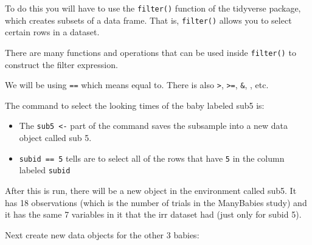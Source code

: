 \documentclass[
]{book}
\newenvironment{Shaded}{\begin{snugshade}}{\end{snugshade}}
\newcommand{\DecValTok}[1]{\textcolor[rgb]{0.00,0.00,0.81}{#1}}
\newcommand{\KeywordTok}[1]{\textcolor[rgb]{0.13,0.29,0.53}{\textbf{#1}}}
\newcommand{\NormalTok}[1]{#1}
\newcommand{\OperatorTok}[1]{\textcolor[rgb]{0.81,0.36,0.00}{\textbf{#1}}}
\newcommand{\StringTok}[1]{\textcolor[rgb]{0.31,0.60,0.02}{#1}}
\providecommand{\tightlist}{%
  \setlength{\itemsep}{0pt}\setlength{\parskip}{0pt}}
\begin{document}
To do this you will have to use the \texttt{filter()} function of the tidyverse package, which creates subsets of a data frame. That is, \texttt{filter()} allows you to select certain rows in a dataset.

There are many functions and operations that can be used inside \texttt{filter()} to construct the filter expression.

We will be using \texttt{==} which means equal to. There is also \texttt{\textgreater{}}, \texttt{\textgreater{}=}, \texttt{\&}, \texttt{\textbar{}}, etc.

The command to select the looking times of the baby labeled sub5 is:

\begin{Shaded}
\end{Shaded}

\begin{itemize}
\tightlist
\item
  The \texttt{sub5\ \textless{}-} part of the command saves the subsample into a new data object called sub 5.\\
\item
  \texttt{subid\ ==\ 5} tells are to select all of the rows that have \texttt{5} in the column labeled \texttt{subid}
\end{itemize}

After this is run, there will be a new object in the environment called sub5. It has 18 observations (which is the number of trials in the ManyBabies study) and it has the same 7 variables in it that the irr dataset had (just only for subid 5).

Next create new data objects for the other 3 babies:

\begin{Shaded}
\end{Shaded}
\end{document}

